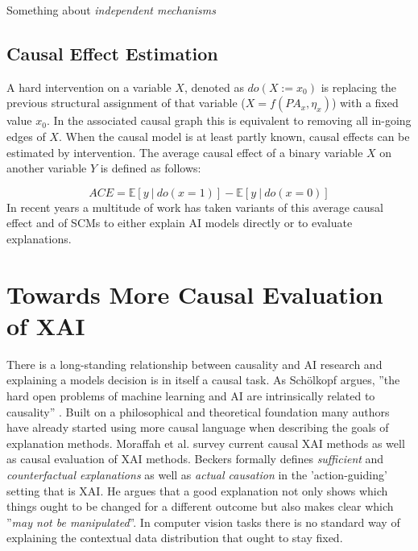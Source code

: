 Something about \textit{independent mechanisms}

\subsection{Causal Effect Estimation}
A hard intervention on a variable $X$, denoted as $do(X := x_0)$ is replacing the previous structural assignment of that variable ($X = f(PA_x, \eta_x)$) with a fixed value $x_0$.  
In the associated causal graph this is equivalent to removing all in-going edges of $X$.
When the causal model is at least partly known, causal effects can be estimated by intervention. The average causal effect of a binary variable $X$ on another variable $Y$ is defined as follows:

\begin{equation}
\displaystyle ACE = \mathbb{E} [ y \ | \ do(x=1) ] - \mathbb{E} [ y \ | \ do(x=0) ] 
\end{equation}
In recent years a multitude of work has taken variants of this average causal effect and of SCMs to either explain AI models directly or to evaluate explanations. 

\section{Towards More Causal Evaluation of XAI}\label{section:causal_xai}

There is a long-standing relationship between causality and AI research and explaining a models decision is in itself a causal task.
As Schölkopf argues, ''the hard open problems of machine learning and AI are intrinsically related to causality'' \cite{Schoelkopf2019}.
Built on a philosophical and theoretical foundation \cite{Woodward2004, Halpern2005, Schoelkopf2019} many authors have already started using more causal language when describing the goals of explanation methods. Moraffah et al. \cite{Moraffah2020a} survey current causal XAI methods as well as causal evaluation of XAI methods. Beckers \cite{Beckers2022} formally defines \textit{sufficient} and \textit{counterfactual explanations} as well as \textit{actual causation} in the 'action-guiding' setting that is XAI. He argues that a good explanation not only shows which things ought to be changed for a different outcome but also makes clear which ''\textit{may not be manipulated}''. In computer vision tasks there is no standard way of explaining the contextual data distribution that ought to stay fixed. 

